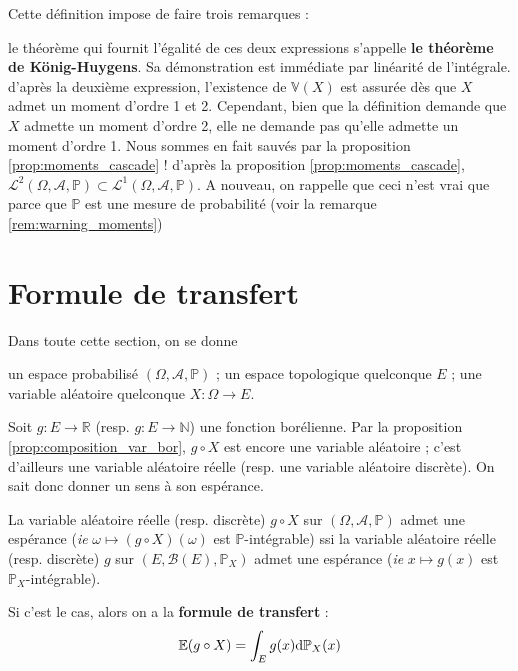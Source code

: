 \documentclass[../integ-proba.tex]{subfiles}
\begin{document}
\begin{rem}
    Cette définition impose de faire trois remarques :
    \begin{itemize}
        \itemb le théorème qui fournit l'égalité de ces deux expressions s'appelle \textbf{le théorème de König-Huygens}. Sa démonstration est immédiate par linéarité de l'intégrale.
        \itemb d'après la deuxième expression, l'existence de $\mathbb{V}(X)$ est assurée dès que $X$ admet un moment d'ordre 1 et 2.
        Cependant, bien que la définition demande que $X$ admette un moment d'ordre 2, elle ne demande pas qu'elle admette un moment d'ordre 1.
        Nous sommes en fait sauvés par la proposition \ref{prop:moments_cascade} !
        \itemb d'après la proposition \ref{prop:moments_cascade}, $\mathcal{L}^2\left(\Omega, \mathcal{A}, \mathbb{P}\right) \subset \mathcal{L}^1\left(\Omega, \mathcal{A}, \mathbb{P}\right)$.
        A nouveau, on rappelle que ceci n'est vrai que parce que $\mathbb{P}$ est une mesure de probabilité (voir la remarque \ref{rem:warning_moments})
    \end{itemize}
\end{rem}

\section{Formule de transfert}

Dans toute cette section, on se donne
\begin{itemize}
    \itemb un espace probabilisé $\left(\Omega, \mathcal{A}, \mathbb{P}\right)$ ;
    \itemb un espace topologique quelconque $E$ ;
    \itemb une variable aléatoire quelconque $X:\Omega \longrightarrow E$.
\end{itemize}

\begin{thm}
    Soit $g:E \longrightarrow \mathbb{R}$ (resp. $g:E \longrightarrow \mathbb{N}$) une fonction borélienne.
    Par la proposition \ref{prop:composition_var_bor}, $g \circ X$ est encore une variable aléatoire ; c'est d'ailleurs une variable aléatoire réelle (resp. une variable aléatoire discrète).
    On sait donc donner un sens à son espérance.

    La variable aléatoire réelle (resp. discrète) $g \circ X$ sur $\left(\Omega, \mathcal{A}, \mathbb{P}\right)$ admet une espérance (\textit{ie} $\omega \mapsto (g \circ X)(\omega)$ est $\mathbb{P}$-intégrable) ssi la variable aléatoire réelle (resp. discrète) $g$ sur $\left(E, \mathcal{B}(E), \mathbb{P}_X\right)$ admet une espérance (\textit{ie} $x \mapsto g(x)$ est $\mathbb{P}_X$-intégrable).
    
    Si c'est le cas, alors on a la \textbf{formule de transfert} :
    $$
    \mathbb{E}(g \circ X) = \int_E g(x)\textnormal{d}\mathbb{P}_X(x)
    $$
\end{thm}
\end{document}
